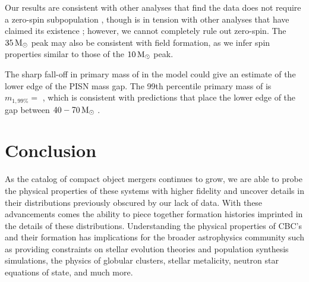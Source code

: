 Our results are consistent with other analyses that find the data does not require a zero-spin subpopulation \citep{arXiv2205.08574,2301.01312}, though is in tension with other analyses that have claimed its existence \citep{doi.org/10.3847/2041-8213/ac2f3c,2105.10580}; however, we cannot completely rule out zero-spin. The $35{\,\rm M}_\odot$ peak may also be consistent with field formation, as we infer spin properties similar to those of the $10{\,\rm M}_\odot$ peak. 

The sharp fall-off in primary mass of \contA{} in the \comp{} model could give an estimate of the lower edge of the PISN mass gap. The 99th percentile primary mass of \contA{} is $m_{1,99\%} = $ \result{$\CIPlusMinus{\macros[Mass][Composite][ContinuumA][99percentile]}$ \msun}, which is consistent with predictions that place the lower edge of the gap between $40-70{\,\rm M}_\odot$ \citep{1901.00215,1910.12874v1,2103.07933v1,2104.07783v2}. 

\section{Conclusion} \label{sec:conclusion}


As the catalog of compact object mergers continues to grow, we are able to probe the physical properties of these systems with higher fidelity and uncover details in their distributions previously obscured by our lack of data. With these advancements comes the ability to piece together formation histories imprinted in the details of these distributions. Understanding the physical properties of CBC's and their formation has implications for the broader astrophysics community such as providing constraints on stellar evolution theories and population synthesis simulations, the physics of globular clusters, stellar metalicity, neutron star equations of state, and much more. 

